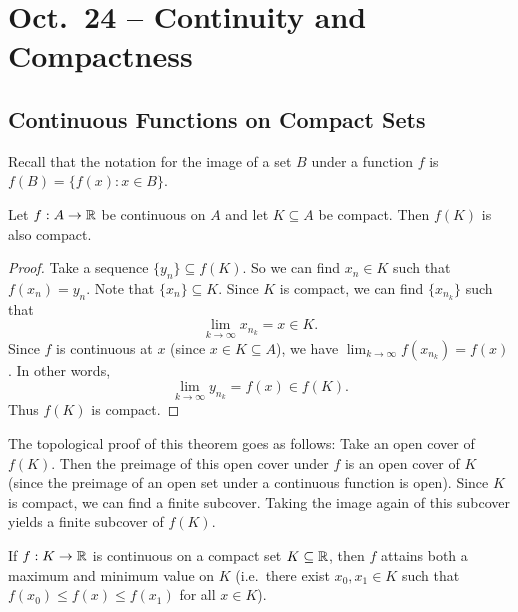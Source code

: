 \chapter{Oct.~24 -- Continuity and Compactness}

\section{Continuous Functions on Compact Sets}
Recall that the notation for the image of a set $B$ under
a function $f$ is $f(B) = \{f(x) : x \in B\}$.

\begin{theorem}
  Let $f : A \to \mathbb{R}$ be continuous on $A$ and let
  $K \subseteq A$ be compact. Then $f(K)$ is also
  compact.
\end{theorem}

\begin{proof}
  Take a sequence $\{y_n\} \subseteq f(K)$. So we
  can find $x_n \in K$ such that $f(x_n) = y_n$.
  Note that $\{x_n\} \subseteq K$. Since $K$ is
  compact, we can find $\{x_{n_k}\}$ such that
  \[\lim_{k \to \infty} x_{n_k} = x \in K.\]
  Since $f$ is continuous at $x$ (since
  $x \in K \subseteq A$), we have
  $\lim_{k \to \infty} f(x_{n_k}) = f(x)$. In other words,
  \[\lim_{k \to \infty} y_{n_k} = f(x) \in f(K).\]
  Thus $f(K)$ is compact.
\end{proof}

\begin{remark}
  The topological proof of this theorem goes as follows:
  Take an open
  cover of $f(K)$. Then the preimage of this open cover
  under $f$ is an open cover of $K$ (since the preimage
  of an open set under a continuous function is open).
  Since $K$ is compact,
  we can find a finite subcover. Taking the image again
  of this subcover yields a finite subcover of $f(K)$.
\end{remark}

\begin{theorem}
  If $f : K \to \mathbb{R}$ is continuous on a compact set
  $K \subseteq \mathbb{R}$, then $f$ attains both a maximum and
  minimum value on $K$ (i.e.~there exist $x_0, x_1 \in K$
  such that $f(x_0) \le f(x) \le f(x_1)$ for all
  $x \in K$).
\end{theorem}

